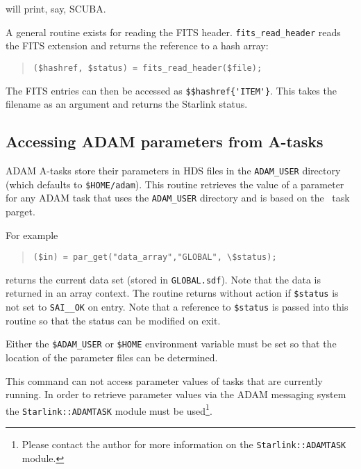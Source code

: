 \documentclass[twoside,11pt]{article}
\newcommand{\xref}[3]{#1}
\newcommand{\xlabel}[1]{}
\newcommand{\task}[1]{{\sf #1}}
\newcommand{\Kappa}{\xref{{\sc{Kappa}}}{sun95}{}}
\newcommand{\parget}{\xref{\task{parget}}{sun95}{PARGET}}
\newenvironment{myquote}{\begin{quote}\begin{small}}{\end{small}\end{quote}}
\begin{document}
will print, say, SCUBA.

A general routine exists for reading the FITS header.
\texttt{fits\_read\_header} reads the FITS extension and returns the
reference to a hash array:

\begin{myquote}
\begin{verbatim}
($hashref, $status) = fits_read_header($file);
\end{verbatim}
\end{myquote}

The FITS entries can then be accessed as \verb+$$hashref{'ITEM'}+.
This takes the filename as an argument and returns the Starlink status.

\subsection{\xlabel{accessing_adam_parameters_from_atasks}Accessing ADAM parameters from A-tasks}%
\label{accessing_adam_parameters_from_atasks}

ADAM A-tasks store their parameters in HDS files in the \texttt{ADAM\_USER}
directory (which defaults to \texttt{\$HOME/adam}). This routine retrieves the
value of a parameter for any ADAM task that uses the \texttt{ADAM\_USER}
directory and is based on the \Kappa\ task \parget.

For example
\begin{myquote}
\begin{verbatim}
($in) = par_get("data_array","GLOBAL", \$status);
\end{verbatim}
\end{myquote}

returns the current data set (stored in \texttt{GLOBAL.sdf}). Note that
the data is returned in an array context. The routine returns without
action if \texttt{\$status} is not set to \texttt{SAI\_\_OK} on entry.
Note that a reference to \texttt{\$status} is passed into this routine
so that the status can be modified on exit.

Either the \texttt{\$ADAM\_USER} or \texttt{\$HOME} environment
variable must be set so that the location of the parameter files can be
determined.

This command can not access parameter values of tasks that are
currently running.  In order to retrieve parameter values via the ADAM
messaging system the \texttt{Starlink::ADAMTASK} module must be
used\footnote{Please contact the author for more information on the
\texttt{Starlink::ADAMTASK} module.}.
\end{document}
